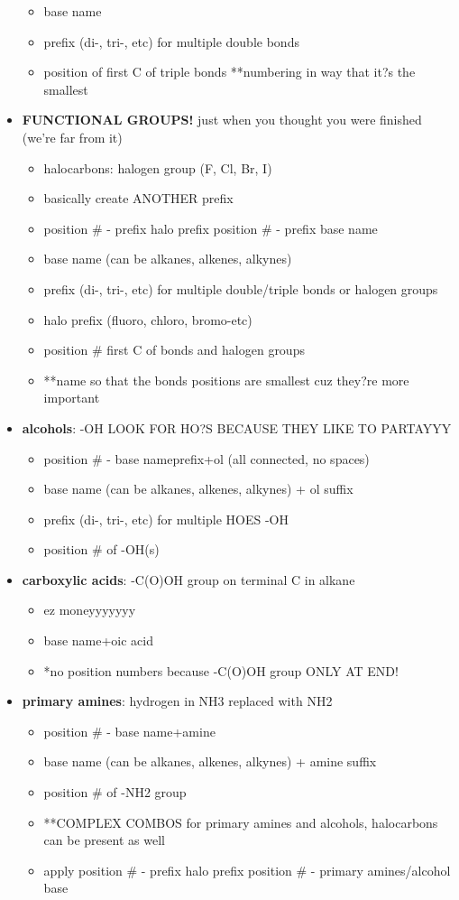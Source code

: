 \documentclass[letterpaper, 12pt]{article}
\begin{document}
\begin{itemize}
\begin{itemize}
			\item base name
			\item prefix (di-, tri-, etc) for multiple double bonds
			\item position of first C of triple bonds **numbering in way that it?s the smallest
		\end{itemize}
		\item \textbf{FUNCTIONAL GROUPS!} just when you thought you were finished (we're far from it)
		\begin{itemize}
			\item halocarbons: halogen group (F, Cl, Br, I)
			\item basically create ANOTHER prefix
			\item position \# - prefix halo prefix position \# - prefix base name
			\item base name (can be alkanes, alkenes, alkynes)
			\item prefix (di-, tri-, etc) for multiple double/triple bonds or halogen groups
			\item halo prefix (fluoro, chloro, bromo-etc)
			\item position \# first C of bonds and halogen groups
			\item **name so that the bonds positions are smallest cuz they?re more important
		\end{itemize}
		\item \textbf{alcohols}: -OH LOOK FOR HO?S BECAUSE THEY LIKE TO PARTAYYY
		\begin{itemize}
			\item position \# -  base nameprefix+ol (all connected, no spaces)
			\item base name (can be alkanes, alkenes, alkynes) + ol suffix
			\item prefix (di-, tri-, etc) for multiple HOES -OH
			\item position \# of -OH(s)
		\end{itemize}
		\item \textbf{carboxylic acids}: -C(O)OH group on terminal C in alkane
		\begin{itemize}
			\item ez moneyyyyyyy
			\item base name+oic acid
			\item *no position numbers because -C(O)OH group ONLY AT END!
		\end{itemize}
		\item \textbf{primary amines}: hydrogen in NH3 replaced with NH2
		\begin{itemize}
			\item position \# - base name+amine
			\item base name (can be alkanes, alkenes, alkynes) + amine suffix
			\item position \# of -NH2 group
			\item **COMPLEX COMBOS for primary amines and alcohols, halocarbons can be present as well
			\item apply position \# - prefix halo prefix position \# - primary amines/alcohol base
		\end{itemize}
	\end{itemize}
\end{document}
